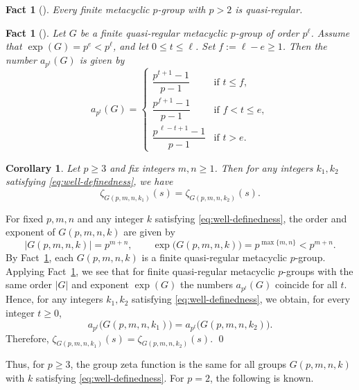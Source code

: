 \documentclass[onecolumn]{article}
\makeatletter
\numberwithin{equation}{section}
\theoremstyle{mytheoremstyle}
\newtheorem{fac}[thm]{Fact}
\newtheorem{cor}[thm]{Corollary}
\renewenvironment{proof}[1][\proofname]{%
  \par\normalfont 
  \topsep6pt\relax 
  \trivlist\item[\hskip\labelsep\itshape #1\@addpunct{.}]\ignorespaces
}{%
  \qed\endtrivlist\@endpefalse
}
\makeatother
\begin{document}
\begin{fac}[\cite{Mann2010}]\label{fac:メタサイクル群の準正則性}
Every finite metacyclic $p$-group with $p>2$ is quasi-regular.
\end{fac}

\begin{fac}[\cite{Berkovich2011}]\label{fac:準正則な部分群個数}
Let $G$ be a finite quasi-regular metacyclic $p$-group of order $p^{\ell}$.
Assume that $\exp(G)=p^{e}<p^{\ell}$, and let $0\le t\le \ell$.
Set $f:=\ell-e\ge 1$.
Then the number $a_{p^{t}}(G)$ is given by
\[
  a_{p^{t}}(G)
  =
  \begin{cases}
    \dfrac{p^{t+1}-1}{p-1} & \text{if } t\le f,\\
    \dfrac{p^{f+1}-1}{p-1} & \text{if } f<t\le e,\\
    \dfrac{p^{\,\ell-t+1}-1}{p-1} & \text{if } t>e.
  \end{cases}
\]
\end{fac}


\begin{cor}\label{cor:pge3-all-similar}
Let $p\ge 3$ and fix integers $m,n\ge 1$.
Then for any integers $k_{1},k_{2}$ satisfying
\eqref{eq:well-definedness}, we have
\[
  \zeta_{G(p,m,n,k_{1})}(s)
  =
  \zeta_{G(p,m,n,k_{2})}(s).
\]
\end{cor}

\begin{proof}
For fixed $p,m,n$ and any integer $k$ satisfying \eqref{eq:well-definedness},
the order and exponent of $G(p,m,n,k)$ are given by
\[
  |G(p,m,n,k)|=p^{m+n},\qquad
  \exp\bigl(G(p,m,n,k)\bigr)=p^{\max\{m,n\}}<p^{m+n}.
\]
By Fact~\ref{fac:メタサイクル群の準正則性}, each $G(p,m,n,k)$ is a finite
quasi-regular metacyclic $p$-group.
Applying Fact~\ref{fac:準正則な部分群個数}, we see that for finite quasi-regular
metacyclic $p$-groups with the same order $|G|$ and exponent $\exp(G)$ the
numbers $a_{p^{t}}(G)$ coincide for all $t$.
Hence, for any integers $k_{1},k_{2}$ satisfying \eqref{eq:well-definedness}, we obtain, for every integer $t\ge 0$,
\[
  a_{p^{t}}\bigl(G(p,m,n,k_{1})\bigr)
  =
  a_{p^{t}}\bigl(G(p,m,n,k_{2})\bigr).
\]
Therefore, $\zeta_{G(p,m,n,k_{1})}(s)=\zeta_{G(p,m,n,k_{2})}(s)$.
\end{proof}

Thus, for $p\ge 3$, the group zeta function is the same for all groups $G(p,m,n,k)$
with $k$ satisfying \eqref{eq:well-definedness}.
For $p=2$, the following is known.
\end{document}

